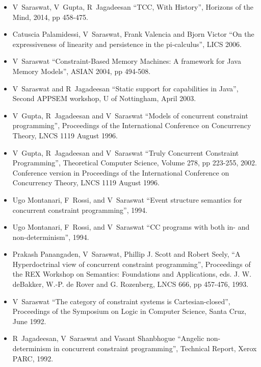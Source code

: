 \documentclass{article}
\begin{document}
\begin{itemize} 
\item V~Saraswat, V~Gupta, R~Jagadeesan ``TCC, With
  History'', Horizons of the Mind, 2014, pp 458-475.

\item Catuscia Palamidessi, V~Saraswat, Frank Valencia and Bjorn
Victor ``On the expressiveness of linearity and persistence in the
pi-calculus'', LICS 2006.

\item V~Saraswat ``Constraint-Based Memory Machines: A framework
for Java Memory Models'', ASIAN 2004, pp 494-508.

\item V~Saraswat and R~Jagadeesan ``Static support for
  capabilities in Java'', Second APPSEM workshop, U of Nottingham,
  April 2003. 


\item  V~Gupta, R~Jagadeesan and V~Saraswat ``Models
  of concurrent constraint programming'', Proceedings of the
  International Conference on Concurrency Theory, LNCS 1119 August
  1996.

\item V~Gupta, R~Jagadeesan and V~Saraswat ``Truly
  Concurrent Constraint Programming'', Theoretical Computer Science,
  Volume 278, pp 223-255, 2002. Conference version in Proceedings of
  the International Conference on Concurrency Theory, LNCS 1119 August
  1996.

\item  Ugo Montanari, F~Rossi, and V~Saraswat ``Event
  structure semantics for concurrent constraint programming'',
  1994.  
  
\item  Ugo Montanari, F~Rossi, and V~Saraswat ``CC
  programs with both in- and non-determinism'', 1994.

\item  Prakash Panangaden, V~Saraswat, Phillip J. Scott and
  Robert Seely, ``A Hyperdoctrinal view of concurrent constraint
  programming'', Proceedings of the REX Workshop on Semantics:
  Foundations and Applications, eds. J. W. deBakker, W.-P. de Rover
  and G. Rozenberg, LNCS 666, pp 457-476, 1993.
  
\item  V~Saraswat ``The category of constraint systems is
  Cartesian-closed'', Proceedings of the Symposium on Logic in
  Computer Science, Santa Cruz, June 1992.

\item R~Jagadeesan, V~Saraswat and Vasant Shanbhogue ``Angelic
  non-determinism in concurrent constraint programming'', Technical
  Report, Xerox PARC, 1992.
  

\end{itemize}
\end{document}
